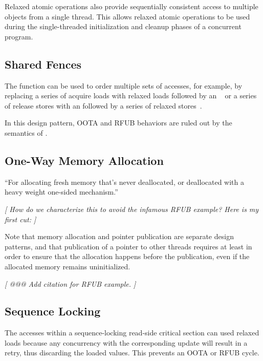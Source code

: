 \documentclass{article}
\begin{document}
Relaxed atomic operations also provide sequentially consistent access
to multiple objects from a single thread.
This allows relaxed atomic operations to be used during the single-threaded
initialization and cleanup phases of a concurrent program.

\subsection{Shared Fences}
\label{sec:Shared Fences}

The  function can be used to order
multiple sets of accesses, for example, by replacing a series of
acquire loads with relaxed loads followed by an
~\cite[Section 4.1]{RaulSilvera2007WeakMemoryModel}
or a series of release stores with an
 followed by
a series of relaxed stores~\cite[Section 4.2]{RaulSilvera2007WeakMemoryModel}.

In this design pattern, OOTA and RFUB behaviors are ruled out by the semantics
of .

\subsection{One-Way Memory Allocation}
\label{sec:One-Way Memory Allocation}

``For allocating fresh memory that's never deallocated, or deallocated
with a heavy weight one-sided mechanism.''

\emph{[ How do we characterize this to avoid the infamous RFUB example?
	Here is my first cut: ]}

Note that memory allocation and pointer publication are separate
design patterns, and that publication of a pointer to other threads
requires at least  in order to ensure that
the allocation happens before the publication, even if the allocated
memory remains uninitialized.

\emph{[ @@@ Add citation for RFUB example. ]}

\subsection{Sequence Locking}
\label{sec:Sequence Locking}

The accesses within a sequence-locking read-side critical section can
used relaxed loads because any concurrency with the corresponding
update will result in a retry, thus discarding the loaded values.
This prevents an OOTA or RFUB cycle.
\end{document}
